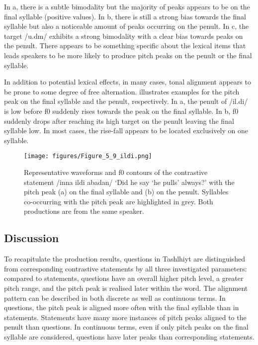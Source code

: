 In a, there is a subtle bimodality but the majority of peaks appears to be on the final syllable (positive values). In b, there is still a strong bias towards the final syllable but also a noticeable amount of peaks occurring on the penult. In c, the target /u.dm/ exhibits a strong bimodality with a clear bias towards peaks on the penult. There appears to be something specific about the lexical items that leads speakers to be more likely to produce pitch peaks on the penult or the final syllable. 

\newpage 
In addition to potential lexical effects, in many cases, tonal alignment appears to be prone to some degree of free alternation.  illustrates examples for the pitch peak on the final syllable and the penult, respectively. In a, the penult of /il.di/ is low before f0 suddenly rises towards the peak on the final syllable. In b, f0 suddenly drops after reaching its high target on the penult leaving the final syllable low. In most cases, the rise-fall appears to be located exclusively on one syllable.

  \begin{figure}
  \centering 
   \texttt{[image: figures/Figure\_5\_9\_ildi.png]}
  \caption{Representative waveforms and f0 contours of the contrastive statement /inna ildi abadan/ ‘Did he say ‘he pulls’ always?’ with the pitch peak (a) on the final syllable and (b) on the penult. Syllables co-occurring with the pitch peak are highlighted in grey. Both productions are from the same speaker.}
   \label{fig:5.9}
   \end{figure}

\subsection{Discussion}
To recapitulate the production results, questions in Tashlhiyt are distinguished from corresponding contrastive statements by all three investigated parameters: compared to statements, questions have an overall higher pitch level, a greater pitch range, and the pitch peak is realised later within the word. The alignment pattern can be described in both discrete as well as continuous terms. In questions, the pitch peak is aligned more often with the final syllable than in statements. Statements have many more instances of pitch peaks aligned to the penult than questions. In continuous terms, even if only pitch peaks on the final syllable are considered, questions have later peaks than corresponding statements.

